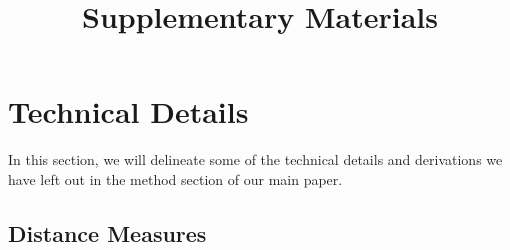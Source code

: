 % 

\title{Supplementary Materials}
\author{}
\institute{}


% 
\maketitle
\vspace{0.8em}


\section{Technical Details}
\label{sec:technical_details}
In this section, we will delineate some of the technical details and derivations we have left out in the method section of our main paper. 

\subsection{Distance Measures}
\label{subsec:distance_measures}

